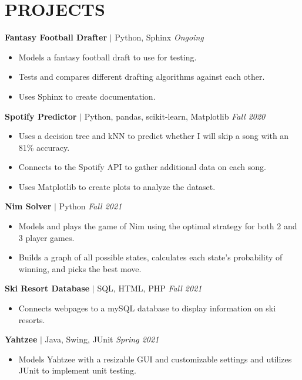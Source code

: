 \documentclass[11pt, a4paper, roman]{moderncv}
\newcommand{\project}[5]{
	\textbf{#1}
	$|$ #3 
	\hfill\textit{#4}
	#5
	\vspace{2mm}
}
\begin{document}
\vspace*{-2mm}
\section{PROJECTS}

\project{Fantasy Football Drafter}{https://github.com/GoneSahlin/fantasydraft}{Python, Sphinx}{Ongoing}
	{\begin{itemize}
		\item Models a fantasy football draft to use for testing.
		\item Tests and compares different drafting algorithms against each other.
		\item Uses Sphinx to create documentation.
	\end{itemize}
}
{\project{Spotify Predictor}{https://github.com/GoneSahlin/CPSC222Final}{Python, pandas, scikit-learn, Matplotlib}{Fall 2020}
	{\begin{itemize}
    		\item Uses a decision tree and kNN to predict whether I will skip a song with an 81\% accuracy.
    		\item Connects to the Spotify API to gather additional data on each song.
   		 \item Uses Matplotlib to create plots to analyze the dataset.
	\end{itemize}}
}
{\project{Nim Solver}{https://github.com/GoneSahlin/Nim}{Python}{Fall 2021}
	{\begin{itemize}
    		\item Models and plays the game of Nim using the optimal strategy for both 2 and 3 player games.
    		\item Builds a graph of all possible states, calculates each state's probability of winning, and picks the best move.
	\end{itemize}}
}
{\project{Ski Resort Database}{https://github.com/GoneSahlin/321_Final_Project}{SQL, HTML, PHP}{Fall 2021}
	{\begin{itemize}
    		\item Connects webpages to a mySQL database to display information on ski resorts.
	\end{itemize}}
}
{\project{Yahtzee}{https://github.com/Gonzaga-University/yahtzee-final-game-a-a-r-o-n}{Java, Swing, JUnit}{Spring 2021}
	{\begin{itemize}
    		\item Models Yahtzee with a resizable GUI and customizable settings and utilizes JUnit to implement unit testing.
	\end{itemize}}
}
\end{document}
